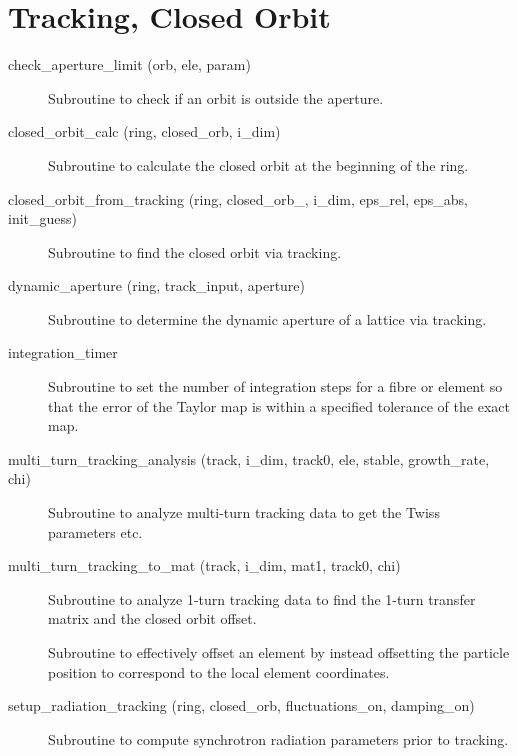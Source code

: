 \section{Tracking, Closed Orbit}
\label{r:track}    

\begin{description}

\item[check\_aperture\_limit (orb, ele, param)] \Newline
Subroutine to check if an orbit is outside the aperture. 

\item[closed\_orbit\_calc (ring, closed\_orb, i\_dim)] \Newline 
     Subroutine to calculate the closed orbit at the beginning of the ring.

\item[closed\_orbit\_from\_tracking (ring, closed\_orb\_, i\_dim, eps\_rel, eps\_abs, init\_guess)] \Newline
Subroutine to find the closed orbit via tracking. 

\item[dynamic\_aperture (ring, track\_input, aperture)] \Newline
Subroutine to determine the dynamic aperture of a lattice via tracking. 

\item[integration\_timer] \Newline 
Subroutine to set the number of integration steps for a fibre or element
so that the error of the Taylor map is within a specified tolerance of the exact map.

\item[multi\_turn\_tracking\_analysis (track, i\_dim, track0, ele, stable, growth\_rate, chi)] \Newline
Subroutine to analyze multi-turn tracking data to get the Twiss parameters etc. 

\item[multi\_turn\_tracking\_to\_mat (track, i\_dim, mat1, track0, chi)] \Newline
Subroutine to analyze 1-turn tracking data to find the 1-turn transfer
matrix and the closed orbit offset.

\item[\protect\parbox{6in}{offset\_particle (ele, param, coord, set, set\_canonical, \\
\hspace*{2in} set\_tilt, set\_multipoles, set\_hvkicks, s\_pos)}] \Newline
Subroutine to effectively offset an element by instead offsetting 
the particle position to correspond to the local element coordinates. 

\item[setup\_radiation\_tracking (ring, closed\_orb, fluctuations\_on, damping\_on)] \Newline
Subroutine to compute synchrotron radiation parameters prior to tracking. 


\end{description}
